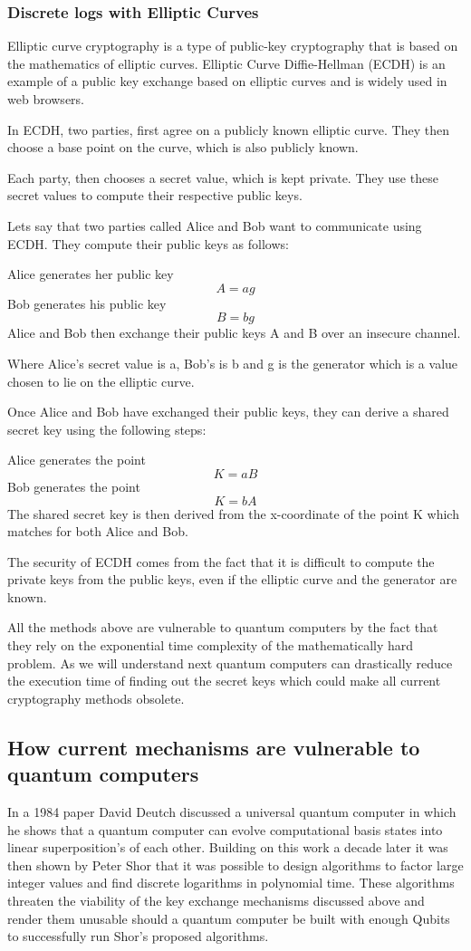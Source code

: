 \documentclass{article}
\begin{document}
\subsubsection{Discrete logs with Elliptic Curves}
Elliptic curve cryptography is a type of public-key cryptography that is based on the mathematics of elliptic curves. Elliptic Curve Diffie-Hellman (ECDH) is an example of a public key exchange based on elliptic curves and is widely used in web browsers.

In ECDH, two parties, first agree on a publicly known elliptic curve. They then choose a base point on the curve, which is also publicly known.

Each party, then chooses a secret value, which is kept private. They use these secret values to compute their respective public keys.

Lets say that two parties called Alice and Bob want to communicate using ECDH. They compute their public keys as follows:

Alice generates her public key \[A = ag\]
Bob generates his public key \[B = bg\] 
Alice and Bob then exchange their public keys A and B over an insecure channel.

Where Alice's secret value is a, Bob's is b and g is the generator which is a value chosen to lie on the elliptic curve.

Once Alice and Bob have exchanged their public keys, they can derive a shared secret key using the following steps:

Alice generates the point \[K = aB\]
Bob generates the point \[K = bA\] 
The shared secret key is then derived from the x-coordinate of the point K which matches for both Alice and Bob.

The security of ECDH comes from the fact that it is difficult to compute the private keys from the public keys, even if the elliptic curve and the generator are known.

All the methods above are vulnerable to quantum computers by the fact that they rely on the exponential time complexity of the mathematically hard problem. As we will understand next quantum computers can drastically reduce the execution time of finding out the secret keys which could make all current cryptography methods obsolete.

\subsection{How current mechanisms are vulnerable to quantum computers}
In a 1984 paper David Deutch \cite{Deutsch1985QuantumComputer} discussed a universal quantum computer in which he shows that a quantum computer can evolve computational basis states into linear superposition's of each other. Building on this work a decade later it was then shown by Peter Shor \cite{Shor1994AlgorithmsFactoring} that it was possible to design algorithms to factor large integer values and find discrete logarithms in polynomial time. These algorithms threaten the viability of the key exchange mechanisms discussed above and render them unusable should a quantum computer be built with enough Qubits to successfully run Shor's proposed algorithms.
\end{document}
